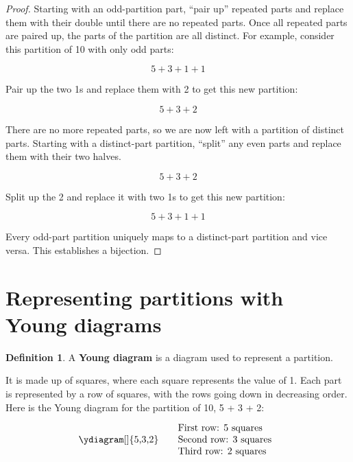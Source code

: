 \documentclass{article}
\theoremstyle{definition}
\newtheorem{definition}{Definition}
\begin{document}
\begin{proof}
Starting with an odd-partition part, ``pair up'' repeated parts and replace them with their double until there are
no repeated parts. Once all repeated parts are paired up, the parts of the partition are all distinct.
\newline For example, consider this partition of 10 with only odd parts:

\[
5 + 3 + 1 + 1
\]

\noindent
Pair up the two 1s and replace them with 2 to get this new partition:

\[
5 + 3 + 2
\]

\noindent
There are no more repeated parts, so we are now left with a partition of distinct parts.
\newline Starting with a distinct-part partition, ``split'' any even parts and replace them with their two halves.

\[
5 + 3 + 2
\]

\noindent
Split up the 2 and replace it with two 1s to get this new partition:

\[
5 + 3 + 1 + 1
\]

\noindent
Every odd-part partition uniquely maps to a distinct-part partition and vice versa. This establishes a bijection.
\end{proof}

\newpage

\section{Representing partitions with Young diagrams}

\begin{definition}
    A \textbf{Young diagram} is a diagram used to represent a partition.
\end{definition}

\noindent
It is made up of squares, where each square represents
the value of 1. Each part is represented by a row of squares, with the rows going down in decreasing order.
\newline Here is the Young diagram for the partition of 10, 5 + 3 + 2:

\[
\begin{minipage}{0.3\textwidth}
    \ydiagram[]
        {5,3,2}
\end{minipage}
\begin{minipage}{0.3\textwidth}
    First row: 5 squares \\
    Second row: 3 squares \\
    Third row: 2 squares
\end{minipage}
\]
\end{document}
